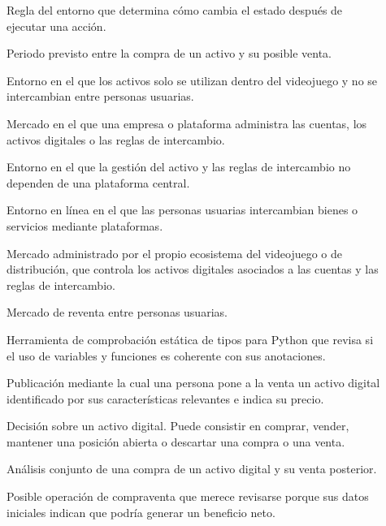 \begin{description}
  \item[] Regla del entorno que determina cómo cambia el estado después de ejecutar una acción.
  \item[] Periodo previsto entre la compra de un activo y su posible venta.
  \item[] Entorno en el que los activos solo se utilizan dentro del videojuego y no se intercambian entre personas usuarias.
  \item[] Mercado en el que una empresa o plataforma administra las cuentas, los activos digitales o las reglas de intercambio.
  \item[] Entorno en el que la gestión del activo y las reglas de intercambio no dependen de una plataforma central.
  \item[] Entorno en línea en el que las personas usuarias intercambian bienes o servicios mediante plataformas.
  \item[] Mercado administrado por el propio ecosistema del videojuego o de distribución, que controla los activos digitales asociados a las cuentas y las reglas de intercambio.
  \item[] Mercado de reventa entre personas usuarias.
  \item[] Herramienta de comprobación estática de tipos para Python que revisa si el uso de variables y funciones es coherente con sus anotaciones.
  \item[] Publicación mediante la cual una persona pone a la venta un activo digital identificado por sus características relevantes e indica su precio.
  \item[] Decisión sobre un activo digital. Puede consistir en comprar, vender, mantener una posición abierta o descartar una compra o una venta.
  \item[] Análisis conjunto de una compra de un activo digital y su venta posterior.
  \item[] Posible operación de compraventa que merece revisarse porque sus datos iniciales indican que podría generar un beneficio neto.

\end{description}
